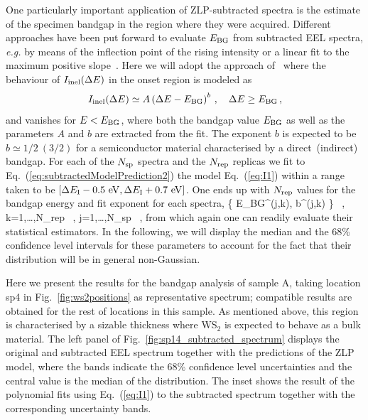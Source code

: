  One particularly important application of ZLP-subtracted spectra is the
 estimate of the specimen bandgap in the region where
 they were acquired.
 Different approaches  have been put forward to evaluate $E_{\rm BG}$ from 
subtracted EEL spectra, \textit{e.g.} by means of the inflection point of the rising intensity or
a linear fit to the maximum positive slope~\cite{Schamm:2003}.
%
Here we will adopt the approach of~\cite{Rafferty:2000} where the behaviour
of $I_{\rm inel}(\Delta E)$ in the onset region is modeled as
\begin{equation}
  \label{eq:I1}
    I_{\rm inel}(\Delta E) \simeq  A \left( \Delta E-E_{\rm BG} \right)^{b} \, , \quad \Delta E \ge E_{\rm BG} \, ,
\end{equation}
and vanishes for $E < E_{\rm BG}$, where both the bandgap value
$E_{\rm BG}$ as well as the parameters $A$ and $b$ are extracted from the fit.
%
The exponent $b$ is expected to be $b\simeq 1/2~(3/2)$ for a semiconductor material characterised
by a direct~(indirect) bandgap.
 For each of the $N_{\rm sp}$ spectra and the $N_{\rm rep}$ replicas
 we fit to Eq.~(\ref{eq:subtractedModelPrediction2}) the model Eq.~(\ref{eq:I1})
 within a range taken to be
 $\left[ \Delta E_{\rm I} - 0.5~{\rm eV}, \Delta E_{\rm I} + 0.7~{\rm eV}\right]$.
 One ends up with $N_{\rm rep}$ values for
 the bandgap energy and fit exponent for each spectra,
 \be
 \Big \{ E_{\rm BG}^{(j,k)}, b^{(j,k)} \Big\} \, , \quad k=1,\ldots,N_{\rm rep} \, ,
 \quad j=1,\ldots,N_{\rm sp} \, ,
 \ee
 from which again one can readily evaluate their statistical estimators.
 In the following, we will display the median and the 68\% confidence level intervals
 for these parameters to account for the fact that their distribution will be in general non-Gaussian.

Here we present the results for the bandgap analysis of sample A,
taking location sp4 in Fig.~\ref{fig:ws2positions} as representative spectrum; compatible
results are obtained for the rest of locations in this sample.
%
As mentioned above, this region is characterised by a sizable thickness where
WS$_2$ is expected to behave as a bulk material.
%
The left panel of Fig.~\ref{fig:sp14_subtracted_spectrum} displays the original
and subtracted EEL spectrum
together with the predictions of the ZLP model, where
the bands indicate the 68\% confidence level uncertainties and the central value
is the median of the distribution.
%
The inset shows the result of the polynomial fits using Eq.~(\ref{eq:I1}) to the subtracted spectrum
together with the corresponding uncertainty bands.

